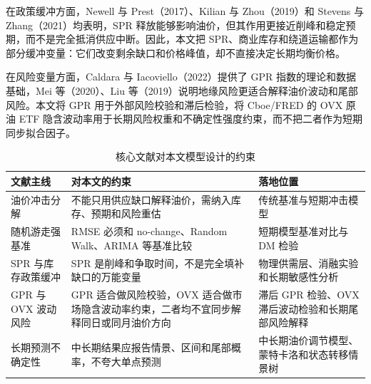 在政策缓冲方面，Newell 与 Prest（2017）、Kilian 与 Zhou（2019）和 Stevens 与 Zhang（2021）均表明，SPR 释放能够影响油价，但其作用更接近削峰和稳定预期，而不是完全抵消供应中断。因此，本文把 SPR、商业库存和绕道运输都作为部分缓冲变量：它们改变剩余缺口和价格峰值，却不直接决定长期均衡价格。

在风险变量方面，Caldara 与 Iacoviello（2022）提供了 GPR 指数的理论和数据基础，Mei 等（2020）、Liu 等（2019）说明地缘风险更适合解释油价波动和尾部风险。本文将 GPR 用于外部风险校验和滞后检验，将 Cboe/FRED 的 OVX 原油 ETF 隐含波动率用于长期风险权重和不确定性强度约束，而不把二者作为短期同步拟合因子。

\begin{table}[!htbp]
\centering
\caption{核心文献对本文模型设计的约束}
\begin{tabularx}{\linewidth}{lX X}
\toprule
文献主线 & 对本文的约束 & 落地位置 \\
\midrule
油价冲击分解 & 不能只用供应缺口解释油价，需纳入库存、预期和风险重估 & 传统基准与短期冲击模型 \\
随机游走强基准 & RMSE 必须和 no-change、Random Walk、ARIMA 等基准比较 & 短期模型基准对比与 DM 检验 \\
SPR 与库存政策缓冲 & SPR 是削峰和争取时间，不是完全填补缺口的万能变量 & 物理供需层、消融实验和长期敏感性分析 \\
GPR 与 OVX 波动风险 & GPR 适合做风险校验，OVX 适合做市场隐含波动率约束，二者均不宜同步解释同日或同月油价方向 & 滞后 GPR 检验、OVX 滞后波动检验和长期尾部风险解释 \\
长期预测不确定性 & 中长期结果应报告情景、区间和尾部概率，不夸大单点预测 & 中长期油价调节模型、蒙特卡洛和状态转移情景树 \\
\bottomrule
\end{tabularx}
\end{table}
